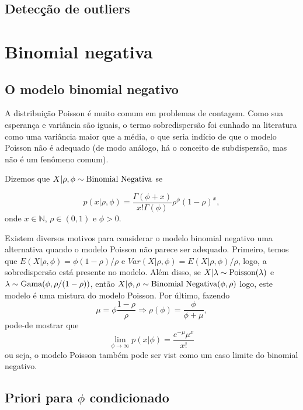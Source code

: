 \documentclass[
  letterpaper,
  DIV=11,
  numbers=noendperiod]{scrreprt}
\theoremstyle{plain}
\theoremstyle{definition}
\theoremstyle{definition}
\theoremstyle{remark}
\begin{document}
\section{Detecção de outliers}\label{detecuxe7uxe3o-de-outliers}


\chapter{Binomial negativa}\label{binomial-negativa}

\section{O modelo binomial negativo}\label{o-modelo-binomial-negativo}

A distribuição Poisson é muito comum em problemas de contagem. Como sua
esperança e variância são iguais, o termo sobredispersão foi cunhado na
literatura como uma variância maior que a média, o que seria indício de
que o modelo Poisson não é adequado (de modo análogo, há o conceito de
subdispersão, mas não é um fenômeno comum).

Dizemos que \(X|\rho,\phi\sim\hbox{Binomial Negativa}\) se

\[p(x|\rho,\phi)=\frac{\Gamma(\phi+x)}{x!\Gamma(\phi)}\rho^\phi(1-\rho)^x,\]
onde \(x\in\mathbb{N}\), \(\rho\in(0,1)\) e \(\phi>0\).

Existem diversos motivos para considerar o modelo binomial negativo uma
alternativa quando o modelo Poisson não parece ser adequado. Primeiro,
temos que \(E(X|\rho,\phi)=\phi(1-\rho)/\rho\) e
\(Var(X|\rho,\phi)=E(X|\rho,\phi)/\rho\), logo, a sobredispersão está
presente no modelo. Além disso, se
\(X|\lambda\sim\hbox{Poisson}(\lambda)\) e
\(\lambda\sim\hbox{Gama}(\phi, \rho/(1-\rho))\), então
\(X|\phi,\rho\sim\hbox{Binomial Negativa}(\phi,\rho)\) logo, este modelo
é uma mistura do modelo Poisson. Por último, fazendo
\[\mu=\phi\frac{1-\rho}{\rho}\Rightarrow \rho(\phi)=\frac{\phi}{\phi+\mu},\]
pode-de mostrar que
\[\lim_{\phi\rightarrow\infty}p(x|\phi)=\frac{e^{-\mu}\mu^x}{x!}\] ou
seja, o modelo Poisson também pode ser vist como um caso limite do
binomial negativo.

\section{\texorpdfstring{Priori para \(\phi\)
condicionado}{Priori para \textbackslash phi condicionado}}\label{priori-para-phi-condicionado}
\end{document}
